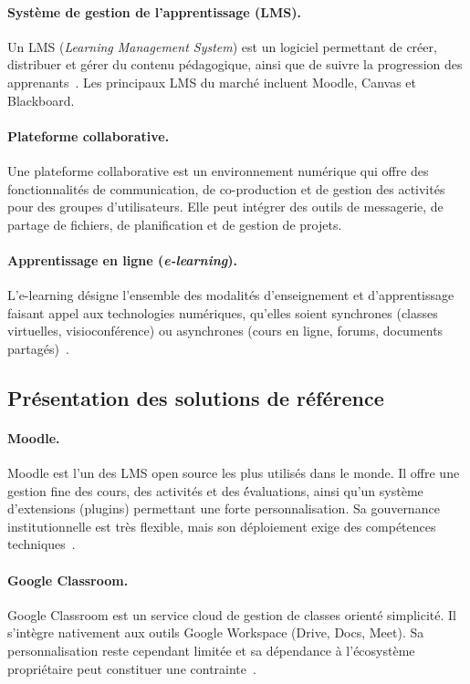 \documentclass[12pt,a4paper,oneside]{report}
\begin{document}
\paragraph{Syst\`eme de gestion de l'apprentissage (LMS).}
Un LMS (\textit{Learning Management System}) est un logiciel permettant de cr\'eer, distribuer et g\'erer du contenu p\'edagogique, ainsi que de suivre la progression des apprenants~\cite{moodle_overview_2026}. Les principaux LMS du march\'e incluent Moodle, Canvas et Blackboard.

\paragraph{Plateforme collaborative.}
Une plateforme collaborative est un environnement num\'erique qui offre des fonctionnalit\'es de communication, de co-production et de gestion des activit\'es pour des groupes d'utilisateurs. Elle peut int\'egrer des outils de messagerie, de partage de fichiers, de planification et de gestion de projets.

\paragraph{Apprentissage en ligne (\textit{e-learning}).}
L'e-learning d\'esigne l'ensemble des modalit\'es d'enseignement et d'apprentissage faisant appel aux technologies num\'eriques, qu'elles soient synchrones (classes virtuelles, visioconf\'erence) ou asynchrones (cours en ligne, forums, documents partag\'es)~\cite{unesco_digital_2026}.

\subsection{Pr\'esentation des solutions de r\'ef\'erence}

\paragraph{Moodle.}
Moodle est l'un des LMS open source les plus utilis\'es dans le monde. Il offre une gestion fine des cours, des activit\'es et des \'évaluations, ainsi qu'un syst\`eme d'extensions (plugins) permettant une forte personnalisation. Sa gouvernance institutionnelle est tr\`es flexible, mais son d\'eploiement exige des comp\'etences techniques~\cite{moodle_overview_2026}.

\paragraph{Google Classroom.}
Google Classroom est un service cloud de gestion de classes orient\'e simplicit\'e. Il s'int\`egre nativement aux outils Google Workspace (Drive, Docs, Meet). Sa personnalisation reste cependant limit\'ee et sa d\'ependance \`a l'\'ecosyst\`eme propri\'etaire peut constituer une contrainte~\cite{google_classroom_2026}.
\end{document}
